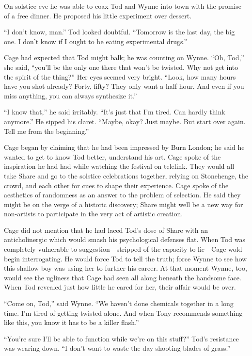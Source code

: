 On solstice eve he was able to coax Tod and Wynne into town with the promise of a free dinner. He proposed his little experiment over dessert.

“I don’t know, man.” Tod looked doubtful. “Tomorrow is the last day, the big one. I don’t know if I ought to be eating experimental drugs.”

Cage had expected that Tod might balk; he was counting on Wynne. “Oh, Tod,” she said, “you’ll be the only one there that won’t be twisted. Why not get into the spirit of the thing?” Her eyes seemed very bright. “Look, how many hours have you shot already? Forty, fifty? They only want a half hour. And even if you miss anything, you can always synthesize it.”

“I know that,” he said irritably. “It’s just that I’m tired. Can hardly think anymore.” He sipped his claret. “Maybe, okay? Just maybe. But start over again. Tell me from the beginning.”

Cage began by claiming that he had been impressed by Burn London; he said he wanted to get to know Tod better, understand his art. Cage spoke of the inspiration he had had while watching the festival on telelink. They would all take Share and go to the solstice celebrations together, relying on Stonehenge, the crowd, and each other for cues to shape their experience. Cage spoke of the aesthetics of randomness as an answer to the problem of selection. He said they might be on the verge of a historic discovery; Share might well be a new way for non-artists to participate in the very act of artistic creation.

Cage did not mention that he had laced Tod’s dose of Share with an anticholinergic which would smash his psychological defenses flat. When Tod was completely vulnerable to suggestion—stripped of the capacity to lie—Cage wold begin interrogating. He would force Tod to tell the truth; force Wynne to see how this shallow boy was using her to further his career. At that moment Wynne, too, would see the ugliness that Cage had seen all along beneath the handsome face. When Tod revealed just how little he cared for her, their affair would be over.

“Come on, Tod,” said Wynne. “We haven’t done chemicals together in a long time. I’m tired of getting twisted alone. And when Tony recommends something like this, you know it has to be a killer flash.”

“You’re sure I’ll be able to function while we’re on this stuff?” Tod’s resistance was wearing down. “I don’t want to waste the day shooting blades of grass.”

